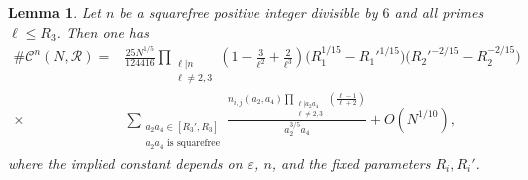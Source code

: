 \documentclass[table]{amsart}
\newtheorem{lemma}[theorem]{Lemma}
\numberwithin{equation}{section}
\begin{document}
\begin{lemma}\label{lem:Rn-asymp}
Let $n$ be a squarefree positive integer divisible by $6$ and all primes $\ell\leq R_3$. Then one has
\[
\begin{split}\#\mathcal{C}^n(N,\mathscr{R})
=&
\frac{25 N^{1/5}}{124416}\prod_{\substack{\ell|n\\\ell\neq 2,3}}\left(1-\frac{3}{\ell^2}+\frac{2}{\ell^3}\right)
\bigl(R_1^{1/15}-R_1'^{1/15}\bigr)
\bigl(R_2'^{-2/15}-R_2^{-2/15}\bigr) \\
\times &\sum_{\substack{a_2a_4\in [R_3', R_3]\\
    a_2a_4\text{ is squarefree}}}\frac{n_{i,j}(a_2,a_4)\prod_{\substack{\ell|a_2a_4\\ \ell\neq 2,3}}\left(\frac{\ell-1}{\ell+2}\right)}{a_2^{3/5} a_4}+
O\!\left(N^{1/10}\right),
\end{split}\]
where the implied constant depends on $\varepsilon$, $n$, and the fixed
parameters $R_i,R_i'$.
\end{lemma}
\end{document}
